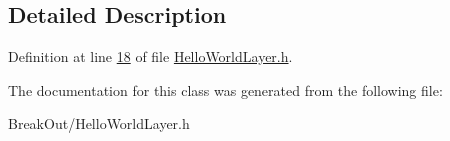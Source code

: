 \subsection{Detailed Description}


Definition at line \hyperlink{_hello_world_layer_8h_source_l00018}{18} of file \hyperlink{_hello_world_layer_8h_source}{Hello\-World\-Layer.\-h}.



The documentation for this class was generated from the following file\-:\begin{DoxyCompactItemize}
\item 
Break\-Out/Hello\-World\-Layer.\-h\end{DoxyCompactItemize}
